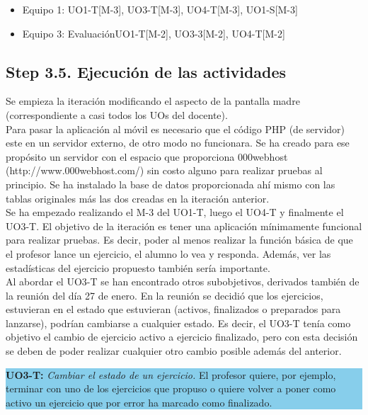 \begin{itemize}
\item Equipo 1: UO1-T[M-3], UO3-T[M-3], UO4-T[M-3], UO1-S[M-3]
\item Equipo 3: Evaluación{UO1-T[M-2], UO3-3[M-2], UO4-T[M-2]}
\end{itemize}

\subsection{Step 3.5. Ejecución de las actividades}
\label{it5:3.5}

Se empieza la iteración modificando el aspecto de la pantalla madre (correspondiente a casi todos los UOs del docente).\\

Para pasar la aplicación al móvil es necesario que el código PHP (de servidor) este en un servidor externo, de otro modo no funcionara. Se ha creado para ese propósito un servidor con el espacio que proporciona 000webhost (http://www.000webhost.com/) sin costo alguno para realizar pruebas al principio. Se ha instalado la base de datos proporcionada ahí mismo con las tablas originales más las dos creadas en la iteración anterior.\\

Se ha empezado realizando el M-3 del UO1-T, luego el UO4-T y finalmente el UO3-T. El objetivo de la iteración es tener una aplicación mínimamente funcional para realizar pruebas. Es decir, poder al menos realizar la función básica de que el profesor lance un ejercicio, el alumno lo vea y responda. Además, ver las estadísticas del ejercicio propuesto también sería importante.\\

Al abordar el UO3-T se han encontrado otros subobjetivos, derivados también de la reunión del día 27 de enero. En la reunión se decidió que los ejercicios, estuvieran en el estado que estuvieran (activos, finalizados o preparados para lanzarse), podrían cambiarse a cualquier estado. Es decir, el UO3-T tenía como objetivo el cambio de ejercicio activo a ejercicio finalizado, pero con esta decisión se deben de poder realizar cualquier otro cambio posible además del anterior.\\

\vspace{0.1cm}

\colorbox{SkyBlue}{\parbox[c]{1.0\textwidth}{
\textbf{UO3-T:} \textit{Cambiar el estado de un ejercicio.} El profesor quiere, por ejemplo, terminar con uno de los ejercicios que propuso o quiere volver a poner como activo un ejercicio que por error ha marcado como finalizado.\\
}}\\

